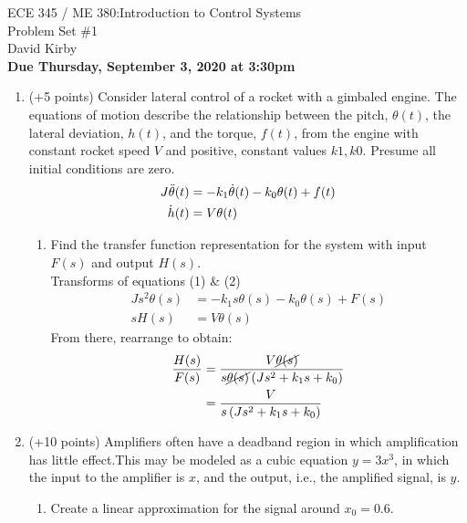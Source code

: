 \documentclass[11pt]{article}
\begin{document}
 	\begin{center}
 	\LARGE{ECE 345 / ME 380:Introduction to Control Systems\\Problem Set \#1}\\[1.5em]
 	\large David Kirby\\[1.5em]
 	\large \textbf{Due Thursday, September 3, 2020 at 3:30pm}\\[2.5em]
 	\end{center}

\begin{enumerate}
    \item (+5 points) Consider lateral control of a rocket with a gimbaled engine. The equations of motion describe the relationship between the pitch, \(\theta(t)\), the lateral deviation, \(h(t)\), and the torque, \(f(t)\), from the engine with constant rocket speed \(V\) and positive, constant values \(k1,k0\). Presume all initial conditions are zero.
    \begin{align}
        J\ddot{\theta}(t)&=-k_{1}\dot{\theta}(t)-k_{0}\theta(t)+f(t)\\
        \dot{h}(t)&=V\theta(t)\notag
    \end{align}
    \begin{enumerate}
        \item Find the transfer function representation for the system with input \(F(s)\) and output \(H(s)\).\\[1em]
        Transforms of equations (1) \& (2)
        \begin{align*}
            Js^{2}\theta(s)&=-k_{1}s\theta(s)-k_{0}\theta(s)+F(s)\\
            sH(s)&=V\theta(s)
        \end{align*}
        From there, rearrange to obtain:
        \begin{align*}
            \frac{H(s)}{F(s)}&=\frac{V\cancel{\theta(s)}}{s\cancel{\theta(s)}\left(Js^{2}+k_{1}s+k_{0}\right)}\\
            &=\frac{V}{s\left(Js^{2}+k_{1}s+k_{0}\right)}
        \end{align*}
    \end{enumerate}
    \item (+10 points) Amplifiers often have a deadband region in which amplification has little effect.This may be modeled as a cubic equation \(y= 3x^3\), in which the input to the amplifier is \(x\), and the output, i.e., the amplified signal, is \(y\).
    \begin{enumerate}
        \item Create a linear approximation for the signal around \({x_0= 0.6}\).

\end{enumerate}
\end{enumerate}
\end{document}
